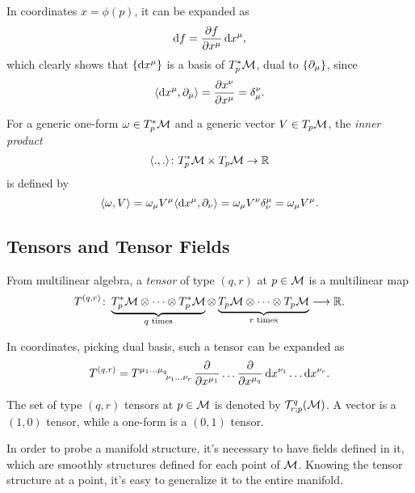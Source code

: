 In coordinates $x = \phi(p)$, it can be expanded as
\begin{equation}
	\mathop{}\!\mathrm{d} f = \frac{\partial f}{\partial x^\mu} \mathop{}\!\mathrm{d} x^\mu,
\end{equation}
which clearly shows that $\{ \mathop{}\!\mathrm{d} x^\mu \}$ is a basis of $T^*_p \mathcal{M}$, dual to $\{ \partial_\mu \}$, since
\begin{equation}
	\langle \mathop{}\!\mathrm{d} x^\mu, \partial_\mu \rangle = \frac{\partial x^\nu}{\partial x^\mu} = \delta^\nu_\mu .
\end{equation}

For a generic one-form $\omega \in T^*_p \mathcal{M}$ and a generic vector $V \in T_p \mathcal{M}$, the \emph{inner product}
\begin{equation}
    \langle ., . \rangle\colon T^*_p \mathcal{M} \times T_p \mathcal{M} \to \mathbb{R}
\end{equation}
is defined by
\begin{equation}\label{eq:def-inner-product-vector-one-form}
	\langle \omega, V \rangle = \omega_\mu V^\mu \langle \mathop{}\!\mathrm{d} x^\mu, \partial_\nu \rangle = \omega_\mu V^\nu \delta^\mu_\nu = \omega_\mu V^\mu.
\end{equation}

\subsection{Tensors and Tensor Fields}
From multilinear algebra, a \emph{tensor} of type $(q,r)$ at $p \in \mathcal{M}$ is a multilinear map 
\begin{equation}
	T^{(q,r)} \colon
	\underbrace{T^*_p \mathcal{M} \otimes \dots \otimes T^*_p \mathcal{M}}_\text{$q$ times}
	\otimes
	\underbrace{T_p \mathcal{M} \otimes \dots \otimes T_p \mathcal{M}}_\text{$r$ times} \longrightarrow \mathbb{R}.
\end{equation}

In coordinates, picking dual basis, such a tensor can be expanded as
\begin{equation}
	T^{(q,r)} = \tensor{T}{^{\mu_1}^\dots^{\mu_q}_{\nu_1}_\dots_{\nu_r}} \frac{\de}{\de x^{\mu_1}} \dots \frac{\de}{\de x^{\mu_q}} \ud x^{\nu_1} \dots \ud x^{\nu_r}.
\end{equation}

The set of type $(q,r)$ tensors at $p \in \mathcal{M}$ is denoted by $\mathcal{T}^q_{r;p}(\mathcal{M})$. A vector is a $(1,0)$ tensor, while a one-form is a $(0,1)$ tensor.

In order to probe a manifold structure, it's necessary to have fields defined in it, which are smoothly structures defined for each point of $\mathcal{M}$. Knowing the tensor structure at a point, it's easy to generalize it to the entire manifold.

